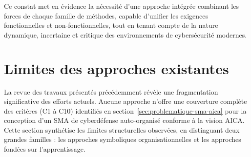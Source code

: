 \documentclass[ twoside,openright,titlepage,numbers=noenddot,headinclude,%
                footinclude=true,cleardoublepage=empty,abstractoff, %
                BCOR=5mm,paper=a4,fontsize=11pt,%
                french,american,%
                ]{scrreprt}
\begin{document}
Ce constat met en évidence la nécessité d'une approche intégrée combinant les forces de chaque famille de méthodes, capable d'unifier les exigences fonctionnelles et non-fonctionnelles, tout en tenant compte de la nature dynamique, incertaine et critique des environnements de cybersécurité modernes.


\section{Limites des approches existantes}\label{sec:limits-existing}


La revue des travaux présentés précédemment révèle une fragmentation significative des efforts actuels. Aucune approche n'offre une couverture complète des critères (C1 à C10) identifiés en section~\ref{sec:problematique-sma-aica} pour la conception d'un SMA de cyberdéfense auto-organisé conforme à la vision AICA. Cette section synthétise les limites structurelles observées, en distinguant deux grandes familles : les approches symboliques organisationnelles et les approches fondées sur l'apprentissage.
\end{document}
